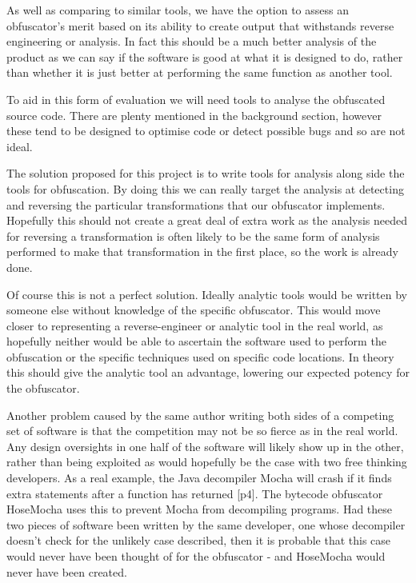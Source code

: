 \documentclass{report}
\begin{document}
As well as comparing to similar tools, we have the option to assess an obfuscator's merit based on
its ability to create output that withstands reverse engineering or analysis. In fact this should be
a much better analysis of the product as we can say if the software is good at what it is designed to do, rather
than whether it is just better at performing the same function as another tool.

To aid in this form of evaluation we will need tools to analyse the obfuscated source code. There are plenty
mentioned in the background section, however these tend to be designed to optimise code or detect possible bugs and so
are not ideal.

The solution proposed for this project is to write tools for analysis along side the tools for obfuscation.
By doing this we can really target the analysis at detecting and reversing the particular transformations
that our obfuscator implements. Hopefully this should not create a great deal of extra work as the analysis
needed for reversing a transformation is often likely to be the same form of analysis performed to make that
transformation in the first place, so the work is already done.

Of course this is not a perfect solution. Ideally analytic tools would be written by someone else without
knowledge of the specific obfuscator. This would move closer to representing a reverse-engineer or analytic
tool in the real world, as hopefully neither would be able to ascertain the software used to perform the obfuscation
or the specific techniques used on specific code locations. In theory this should give the analytic tool an
advantage, lowering our expected potency for the obfuscator.

Another problem caused by the same author writing both sides of a competing set of software is that the competition
may not be so fierce as in the real world. Any design oversights in one half of the software will likely show up
in the other, rather than being exploited as would hopefully be the case with two free thinking developers. As a real
example, the Java decompiler Mocha will crash if it finds extra statements after a function has returned
\cite{hosemocha}[p4]. The bytecode obfuscator HoseMocha uses this to prevent Mocha from decompiling programs. Had these two
pieces of software been written by the same developer, one whose decompiler doesn't check for the unlikely case described,
then it is probable that this case would never have been thought of for the obfuscator - and HoseMocha would never have
been created.
\end{document}
